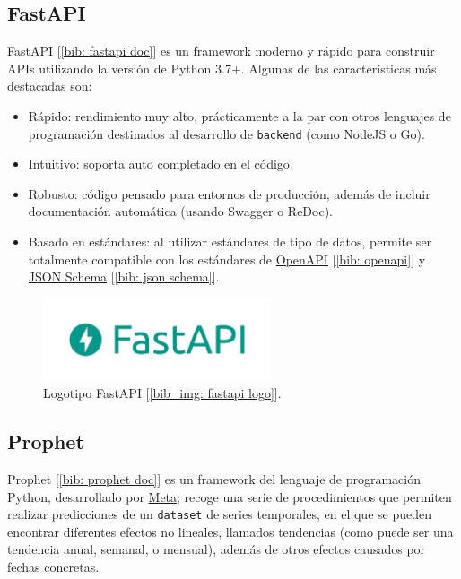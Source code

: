 \documentclass[a4paper, oneside, 12pt]{book}
\begin{document}
	\subsection{FastAPI}
	\label{sec: fastapi}
	
	\noindent FastAPI [\ref{bib: fastapi doc}] es un framework moderno y rápido para construir APIs utilizando la versión de Python 3.7+. Algunas de las características más destacadas son:
	
	\begin{itemize}
		\item Rápido: rendimiento muy alto, prácticamente a la par con otros lenguajes de programación destinados al desarrollo de \texttt{backend} (como NodeJS o Go).
		\item Intuitivo: soporta auto completado en el código.
		\item Robusto: código pensado para entornos de producción, además de incluir documentación automática (usando Swagger o ReDoc).
		\item Basado en estándares: al utilizar estándares de tipo de datos, permite ser totalmente compatible con los estándares de \href{https://github.com/OAI/OpenAPI-Specification}{OpenAPI} [\ref{bib: openapi}] y \href{https://json-schema.org/}{JSON Schema} [\ref{bib: json schema}].
	\end{itemize}
	
	\pagebreak
	
	\begin{figure}[h!]
		\begin{center}
			\includegraphics[width=0.6\textwidth]{img/fastapi_logo.png}
			\caption{Logotipo FastAPI [\ref{bib_img: fastapi logo}].}
			\label{img: fastapi logo}
		\end{center}
	\end{figure}

	\subsection{Prophet}
	\label{sec: prophet}
	
	\noindent Prophet [\ref{bib: prophet doc}] es un framework del lenguaje de programación Python, desarrollado por \href{https://github.com/facebook/}{Meta}; recoge una serie de procedimientos que permiten realizar predicciones de un \texttt{dataset} de series temporales, en el que se pueden encontrar diferentes efectos no lineales, llamados tendencias (como puede ser una tendencia anual, semanal, o mensual), además de otros efectos causados por fechas concretas. \\
	
\end{document}
